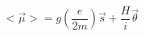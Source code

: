 \begin{equation}
<\overrightarrow{\mu}>=g\left(\frac{e}{2m}\right)\overrightarrow{s}+\frac{\textit{H}}{i}\overrightarrow{\theta}
\end{equation}

